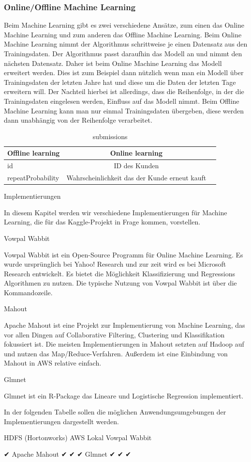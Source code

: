 \subsubsection{Online/Offline Machine Learning}

Beim Machine Learning gibt es zwei verschiedene Ansätze, zum einen das Online Machine Learning und zum anderen das Offline Machine Learning. Beim Online Machine Learning nimmt der Algorithmus schrittweise je einen Datensatz aus den Trainingsdaten. Der Algorithmus passt daraufhin das Modell an und nimmt den nächsten Datensatz. Daher ist beim Online Machine Learning das Modell erweitert werden. Dies ist zum Beispiel dann nützlich wenn man ein Modell über Trainingsdaten der letzten Jahre hat und diese um die Daten der letzten Tage erweitern will. Der Nachteil hierbei ist allerdings, dass die Reihenfolge, in der die Trainingsdaten eingelesen werden, Einfluss auf das Modell nimmt. Beim Offline Machine Learning kann man nur einmal Trainingsdaten übergeben, diese werden dann unabhängig von der Reihenfolge verarbeitet.

\begin{table}[h]
	\centering
\begin{tabular}{l|c|c}
	\textbf{} \textbf{Offline learning} & \textbf{Online learning}  \\ 
	\hline id & ID des Kunden \\ 
	\hline repeatProbability & Wahrscheinlichkeit das der Kunde erneut kauft 
	\vspace{0.3cm} \\
\end{tabular} 
\caption{submissions}
\label{tab:submissions}
\end{table}

 
Implementierungen

In diesem Kapitel werden wir verschiedene Implementierungen für Machine Learning, die für das Kaggle-Projekt in Frage kommen, vorstellen.

Vowpal Wabbit

Vowpal Wabbit ist ein Open-Source Programm für Online Machine Learning. Es wurde ursprünglich bei Yahoo! Research und zur zeit wird es bei Microsoft Research entwickelt. Es bietet die Möglichkeit Klassifizierung und Regressions Algorithmen zu nutzen. Die typische Nutzung von Vowpal Wabbit ist über die Kommandozeile.

Mahout

Apache Mahout ist eine Projekt zur Implementierung von Machine Learning, das vor allen Dingen auf Collaborative Filtering, Clustering und Klassifikation fokussiert ist. Die meisten Implementierungen in Mahout setzten auf Hadoop auf und nutzen das Map/Reduce-Verfahren. Außerdem ist eine Einbindung von Mahout in AWS relative einfach.

Glmnet

Glmnet ist ein R-Package das Lineare und Logistische Regression implementiert.


In der folgenden Tabelle sollen die möglichen Anwendungsumgebungen der Implementierungen dargestellt werden.



HDFS (Hortonworks)
AWS
Lokal
Vowpal Wabbit




✔
Apache Mahout
✔
✔
✔
Glmnet
✔
✔
✔

